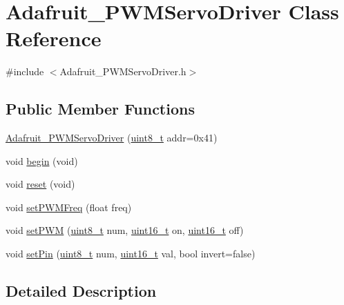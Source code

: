 \hypertarget{classAdafruit__PWMServoDriver}{\section{Adafruit\+\_\+\+P\+W\+M\+Servo\+Driver Class Reference}
\label{classAdafruit__PWMServoDriver}
}


{\ttfamily \#include $<$Adafruit\+\_\+\+P\+W\+M\+Servo\+Driver.\+h$>$}

\subsection*{Public Member Functions}
\begin{DoxyCompactItemize}
\item 
\hyperlink{classAdafruit__PWMServoDriver_a6a949db60836febbc61adef4cc5429ed}{Adafruit\+\_\+\+P\+W\+M\+Servo\+Driver} (\hyperlink{Servo__Position__Shell_8h_ab077fa1127453be2bd9d4c3c8a768fa7}{uint8\+\_\+t} addr=0x41)
\item 
void \hyperlink{classAdafruit__PWMServoDriver_aef401eaad3c34222ac916eb7bd936bc2}{begin} (void)
\item 
void \hyperlink{classAdafruit__PWMServoDriver_ac976f52233a75a4bd0eb6f2ce9b82b7f}{reset} (void)
\item 
void \hyperlink{classAdafruit__PWMServoDriver_a0ef6f1e3c81aebbd1d1da1bb12f3ed5c}{set\+P\+W\+M\+Freq} (float freq)
\item 
void \hyperlink{classAdafruit__PWMServoDriver_a724a7fc39c6fba34478ecc0eea038bd3}{set\+P\+W\+M} (\hyperlink{Servo__Position__Shell_8h_ab077fa1127453be2bd9d4c3c8a768fa7}{uint8\+\_\+t} num, \hyperlink{Adafruit__PWMServoDriver_8h_a395b3b2bf5cb4674ab41b6bda68c15bb}{uint16\+\_\+t} on, \hyperlink{Adafruit__PWMServoDriver_8h_a395b3b2bf5cb4674ab41b6bda68c15bb}{uint16\+\_\+t} off)
\item 
void \hyperlink{classAdafruit__PWMServoDriver_a1246cd50849fe0f068cc5d474e06ae96}{set\+Pin} (\hyperlink{Servo__Position__Shell_8h_ab077fa1127453be2bd9d4c3c8a768fa7}{uint8\+\_\+t} num, \hyperlink{Adafruit__PWMServoDriver_8h_a395b3b2bf5cb4674ab41b6bda68c15bb}{uint16\+\_\+t} val, bool invert=false)
\end{DoxyCompactItemize}


\subsection{Detailed Description}


